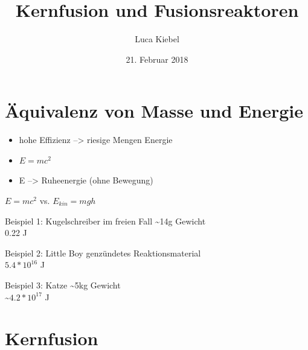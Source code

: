 \documentclass[10pt,a4paper, ngerman]{beamer}
\author{Luca Kiebel}
\title{Kernfusion und Fusionsreaktoren}
\date{21. Februar 2018}
\institute[HBBK]{Hans-Böckler-Berufskolleg}
\begin{document}
\begin{frame}
\titlepage
\end{frame}

\section[Energie aus Masse]{Äquivalenz von Masse und Energie}
\begin{frame}{\secname}{\subsecname}
\begin{itemize}[<+->]
\item hohe Effizienz --> riesige Mengen Energie
\item \(E=mc^2\)
\item E --> Ruheenergie (ohne Bewegung)
\end{itemize}
\end{frame}

\begin{frame}{\secname}{\(E=mc^2\) vs. \(E_{kin}=mgh\)}
\begin{exampleblock}{Beispiel 1: Kugelschreiber im freien Fall}
	\textasciitilde14g Gewicht \\
	0.22 J
\end{exampleblock}
\pause
\begin{exampleblock}{Beispiel 2: Little Boy} %
	 genzündetes Reaktionsmaterial \\
	\(5.4*10^{16}\) J 
\end{exampleblock}
\pause[4]
\begin{exampleblock}{Beispiel 3: Katze}
	\textasciitilde5kg Gewicht \\
	\textasciitilde\(4.2*10^{17}\) J
\end{exampleblock}
\end{frame}


\section{Kernfusion}
\end{document}
